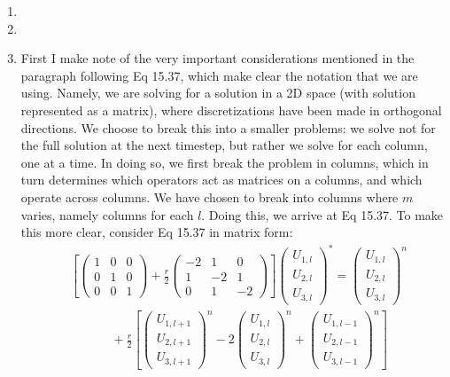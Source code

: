 \documentclass[11pt]{article}
\def\f{\frac }
\begin{document}
\begin{enumerate}
\item

\item

\item First I make note of the very important considerations mentioned in the paragraph following Eq 15.37, which make clear the notation that we are using.
Namely, we are solving for a solution in a 2D space (with solution represented as a matrix), where discretizations have been made in orthogonal directions.
We choose to break this into a smaller problems: we solve not for the full solution at the next timestep, but rather we solve for each column, one at a time.
In doing so, we first break the problem in columns, which in turn determines which operators act as matrices on a columns, and which operate across columns.
We have chosen to break into columns where $m$ varies, namely columns for each $l$.
Doing this, we arrive at Eq 15.37.
To make this more clear, consider Eq 15.37 in matrix form:
\begin{align*} & \left [ \left ( \begin{array}{ccc} 1 & 0 & 0\\ 0 & 1 & 0\\ 0 & 0 & 1 \end{array} \right )  + \f{r}{2} \left ( \begin{array}{ccc} -2 & 1 & 0\\ 1 & -2 & 1\\ 0 & 1 & -2 \end{array} \right )\right ] \left ( \begin{array}{c} U_{1,l} \\ U_{2,l} \\ U_{3,l} \end{array} \right ) ^{*} = \left ( \begin{array}{c} U_{1,l} \\ U_{2,l} \\ U_{3,l} \end{array} \right ) ^{n} \\
&~~~~~~~~~~~~~~~+ \f{r}{2} \left [ \left ( \begin{array}{c} U_{1,l+1} \\ U_{2,l+1} \\ U_{3,l+1} \end{array} \right ) ^{n} - 2\left ( \begin{array}{c} U_{1,l} \\ U_{2,l} \\ U_{3,l} \end{array} \right ) ^{n} + \left ( \begin{array}{c} U_{1,l-1} \\ U_{2,l-1} \\ U_{3,l-1} \end{array} \right ) ^{n}\right ] \end{align*}

\end{enumerate}
\end{document}
